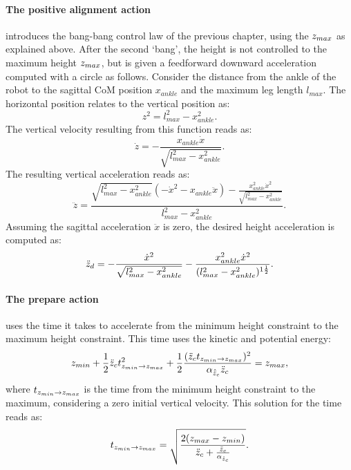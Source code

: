\paragraph{The positive alignment action} introduces the bang-bang control law of the previous chapter, using the $z_{max}$ as explained above. After the second `bang', the height is not controlled to the maximum height $z_{max}$, but is given a feedforward downward acceleration computed with a circle as follows. Consider the distance from the ankle of the robot to the sagittal \ac{CoM} position $x_{ankle}$ and the maximum leg length $l_{max}$. The horizontal position relates to the vertical position as:
\begin{equation}
z^2 = l_{max}^2-x_{ankle}^2.
\end{equation}
The vertical velocity resulting from this function reads as:
\begin{equation}
 \dot{z} = -\frac{x_{ankle}\dot{x}}{\sqrt{l_{max}^2-x_{ankle}^2}}.
\end{equation}
The resulting vertical acceleration reads as:
\begin{equation}
\ddot{z} = \frac{\sqrt{l_{max}^2-x_{ankle}^2}(-\dot{x}^2-x_{ankle}\ddot{x}) - \frac{x_{ankle}^2\dot{x}^2}{\sqrt{l_{max}^2-x_{ankle}^2}}}{ l_{max}^2-x_{ankle}^2}.
\end{equation}
Assuming the sagittal acceleration $\ddot{x}$ is zero, the desired height acceleration is computed as:
\begin{equation}
 \ddot{z}_d = -\frac{\dot{x}^2}{\sqrt{ l_{max}^2-x_{ankle}^2}} - \frac{x_{ankle}^2\dot{x}^2}{(l_{max}^2-x_{ankle}^2)^{1\frac{1}{2}}}.
\end{equation}
\paragraph{The prepare action} uses the time it takes to accelerate from the minimum height constraint to the maximum height constraint. This time uses the kinetic and potential energy:
\begin{equation}
	z_{min} + \frac{1}{2}\ddot{z}_{c} t_{z_{min} \rightarrow z_{max}}^2 + \frac{1}{2}\frac{(\ddot{z}_{c} t_{z_{min} \rightarrow z_{max}})^2}{\alpha_{\hat{\ddot{z}}_{c}} \ddot{z}_{c}} = z_{max},
\end{equation}
where $t_{z_{min} \rightarrow z_{max}}$ is the time from the minimum height constraint to the maximum, considering a zero initial vertical velocity.
This solution for the time reads as:
\begin{equation}
 t_{z_{min} \rightarrow z_{max}}= \sqrt{\frac{2(z_{max} - z_{min})}{\ddot{z}_{c} + \frac{\ddot{z}_{c}}{\alpha_{\hat{\ddot{z}}_{c}}} }}.
\end{equation}

